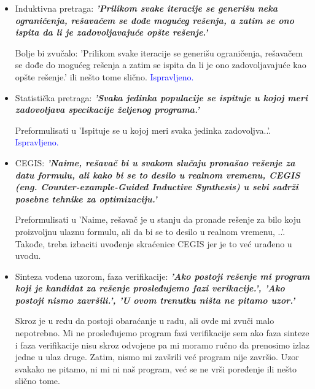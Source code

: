 \documentclass[a4paper]{report}
\newcommand{\odgovor}[1]{\textcolor{blue}{#1}}
\begin{document}
\begin{itemize}
    \item Induktivna pretraga: \textbf{\textit{'Prilikom svake iteracije se generišu neka ograničenja, rešavačem se dođe mogućeg rešenja, a zatim se ono ispita da li je zadovoljavajuće opšte
rešenje.'}}

	Bolje bi zvučalo: 'Prilikom svake iteracije se generišu ograničenja, rešavačem se dođe do mogućeg rešenja a zatim se ispita da li je ono zadovoljavajuće kao opšte rešenje.' ili nešto tome slično.
    \odgovor {Ispravljeno.}

    \item Statistička pretraga: \textbf{\textit{'Svaka jedinka populacije se ispituje u kojoj meri zadovoljava specikacije željenog programa.'}}

    Preformulisati u 'Ispituje se u kojoj meri svaka jedinka zadovoljva..'.
    \odgovor {Ispravljeno.}

    \item CEGIS: \textbf{\textit{'Naime, rešavač bi u svakom slučaju pronašao rešenje za datu formulu, ali kako bi se to desilo u realnom vremenu, CEGIS (eng. Counter-example-Guided Inductive Synthesis) u sebi sadrži posebne tehnike za optimizaciju.'}}

    Preformulisati u 'Naime, rešavač je u stanju da pronađe rešenje za bilo koju proizvoljnu ulaznu formulu, ali da bi se to desilo u realnom vremenu, ..'. Takođe, treba izbaciti uvođenje skraćenice CEGIS jer je to već urađeno u uvodu.

    \item Sinteza vođena uzorom, faza verifikacije: \textbf{\textit{'Ako postoji rešenje mi program koji je kandidat za rešenje prosleđujemo fazi verikacije.', 'Ako postoji nismo završili.', 'U ovom trenutku ništa ne pitamo uzor.'}}

    Skroz je u redu da postoji obaraćanje u radu, ali ovde mi zvuči malo nepotrebno. Mi ne prosleđujemo program fazi verifikacije sem ako faza sinteze i faza verifikacije nisu skroz odvojene pa mi moramo ručno da prenosimo izlaz jedne u ulaz druge. Zatim, nismo mi zavšrili već program nije završio. Uzor svakako ne pitamo, ni mi ni naš program, već se ne vrši poređenje ili nešto slično tome.
\end{itemize}
\end{document}
